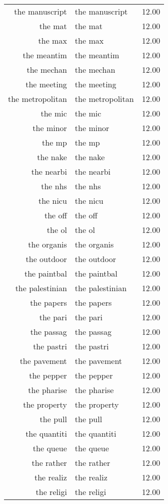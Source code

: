 \begin{table}[ht]
\begin{tabular}{rlr}
  the manuscript & the manuscript & 12.00 \\ 
  the mat & the mat & 12.00 \\ 
  the max & the max & 12.00 \\ 
  the meantim & the meantim & 12.00 \\ 
  the mechan & the mechan & 12.00 \\ 
  the meeting & the meeting & 12.00 \\ 
  the metropolitan & the metropolitan & 12.00 \\ 
  the mic & the mic & 12.00 \\ 
  the minor & the minor & 12.00 \\ 
  the mp & the mp & 12.00 \\ 
  the nake & the nake & 12.00 \\ 
  the nearbi & the nearbi & 12.00 \\ 
  the nhs & the nhs & 12.00 \\ 
  the nicu & the nicu & 12.00 \\ 
  the off & the off & 12.00 \\ 
  the ol & the ol & 12.00 \\ 
  the organis & the organis & 12.00 \\ 
  the outdoor & the outdoor & 12.00 \\ 
  the paintbal & the paintbal & 12.00 \\ 
  the palestinian & the palestinian & 12.00 \\ 
  the papers & the papers & 12.00 \\ 
  the pari & the pari & 12.00 \\ 
  the passag & the passag & 12.00 \\ 
  the pastri & the pastri & 12.00 \\ 
  the pavement & the pavement & 12.00 \\ 
  the pepper & the pepper & 12.00 \\ 
  the pharise & the pharise & 12.00 \\ 
  the property & the property & 12.00 \\ 
  the pull & the pull & 12.00 \\ 
  the quantiti & the quantiti & 12.00 \\ 
  the queue & the queue & 12.00 \\ 
  the rather & the rather & 12.00 \\ 
  the realiz & the realiz & 12.00 \\ 
  the religi & the religi & 12.00 \\ 

\end{tabular}
\end{table}
